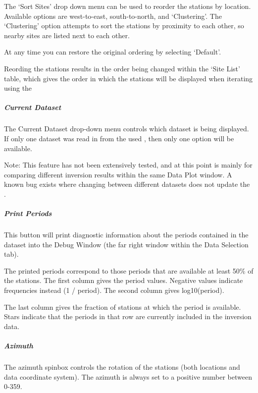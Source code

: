 \documentclass[letterpaper,10pt,english]{sphinxmanual}
\begin{document}
The ‘Sort Sites’ drop down menu can be used to reorder the stations by location. Available options are west-to-east, south-to-north, and ‘Clustering’. The ‘Clustering’ option attempts to sort the stations by proximity to each other, so nearby sites are listed next to each other.

At any time you can restore the original ordering by selecting ‘Default’.

Reording the stations results in the order being changed within the ‘Site List’ table, which gives the order in which the stations will be displayed when iterating using the {\hyperref[\detokenize{content/data_plot/main_window:forward-and-back-buttons}]{}}


\subparagraph{Current Dataset}
\label{\detokenize{content/data_plot/main_window:current-dataset}}
The Current Dataset drop-down menu controls which dataset is being displayed. If only one dataset was read in from the used {\hyperref[\detokenize{content/api_core/input_files:startup-file}]{}}, then only one option will be available.

Note: This feature has not been extensively tested, and at this point is mainly for comparing different inversion results within the same Data Plot window. A known bug exists where changing between different datasets does not update the {\hyperref[\detokenize{content/data_plot/main_window:misfit-table}]{}}.


\subparagraph{Print Periods}
\label{\detokenize{content/data_plot/main_window:print-periods}}
This button will print diagnostic information about the periods contained in the dataset into the Debug Window (the far right window within the Data Selection tab).

The printed periods correspond to those periods that are available at least 50\% of the stations.
The first column gives the period values. Negative values indicate frequencies instead (1 / period).
The second column gives log10(period).

The last column gives the fraction of stations at which the period is available.
Stars indicate that the periods in that row are currently included in the inversion data.


\subparagraph{Azimuth}
\label{\detokenize{content/data_plot/main_window:azimuth}}
The azimuth spinbox controls the rotation of the stations (both locations and data coordinate system).
The azimuth is always set to a positive number between 0-359.
\end{document}
